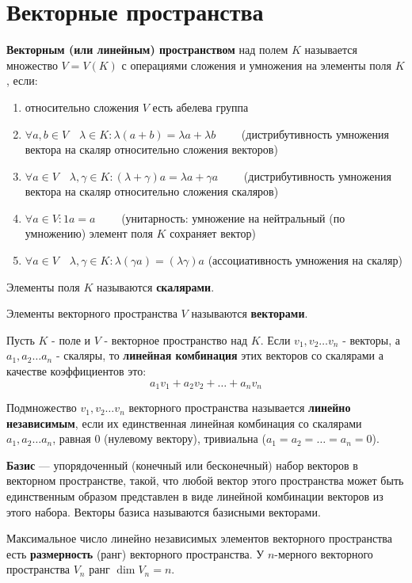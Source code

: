 \texttt{}\section{Векторные пространства}
\textbf{Векторным (или линейным) пространством} над полем $K$ называется множество $V = V(K)$ с операциями сложения и умножения на элементы поля $K$, если:
\begin{enumerate}
	\item относительно сложения $V$ есть абелева группа
	\item $\forall a, b \in V \quad \lambda \in K : \lambda(a + b) = \lambda a + \lambda b \qquad$ (дистрибутивность умножения вектора на скаляр относительно сложения векторов)
	\item $\forall a \in V \quad \lambda, \gamma \in K : (\lambda + \gamma)a = \lambda a + \gamma a \qquad$ (дистрибутивность умножения вектора на скаляр относительно сложения скаляров)
	\item $\forall a \in V : 1a = a \qquad$ (унитарность: умножение на нейтральный (по умножению) элемент поля $K$ сохраняет вектор)
	\item  $\forall a \in V \quad \lambda, \gamma \in K : \lambda (\gamma a) = (\lambda \gamma) a$  (ассоциативность умножения на скаляр)
\end{enumerate}

Элементы поля $K$ называются \textbf{скалярами}.

Элементы векторного пространства $V$ называются \textbf{векторами}.

Пусть $K$ - поле и $V$ - векторное пространство над $K$. Если $v_1, v_2 \ldots v_n$ - векторы, а $a_1, a_2 \ldots a_n$ - скаляры, то \textbf{линейная комбинация} этих векторов со скалярами а качестве коэффициентов это:
$$
a_1 v_1 + a_2 v_2 + \ldots + a_n v_n
$$ 

Подмножество $v_1, v_2 \ldots v_n$ векторного пространства называется \textbf{линейно независимым}, если их единственная линейная комбинация со скалярами $a_1, a_2 \ldots a_n$, равная 0 (нулевому вектору), тривиальна ($a_1 = a_2 = \ldots = a_n = 0$).

\textbf{Базис} — упорядоченный (конечный или бесконечный) набор векторов в векторном пространстве, такой, что любой вектор этого пространства может быть единственным образом представлен в виде линейной комбинации векторов из этого набора. Векторы базиса называются базисными векторами.

Максимальное число линейно независимых элементов векторного пространства есть \textbf{размерность} (ранг) векторного пространства. У $n$-мерного векторного пространства $V_n$ ранг $\dim V_n = n$.
